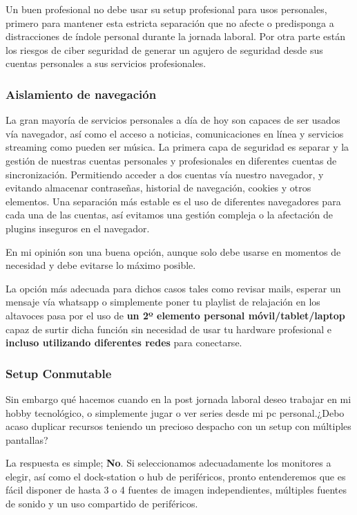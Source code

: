Un buen profesional no debe usar su setup profesional para usos personales, primero para mantener esta estricta separación que no afecte o predisponga a distracciones de índole personal durante la jornada laboral. Por otra parte están los riesgos de ciber seguridad de generar un agujero de seguridad desde sus cuentas personales a sus servicios profesionales.

\subsubsection{Aislamiento de navegación}
La gran mayoría de servicios personales a día de hoy son capaces de ser usados vía navegador, así como el acceso a noticias, comunicaciones en línea y servicios streaming como pueden ser música. La primera capa de seguridad es separar y la gestión de nuestras cuentas personales y profesionales en diferentes cuentas de sincronización. Permitiendo acceder a dos cuentas vía nuestro navegador, y evitando almacenar contraseñas, historial de navegación, cookies y otros elementos. Una separación más estable es el uso de diferentes navegadores para cada una de las cuentas, así evitamos una gestión compleja o la afectación de plugins inseguros en el navegador.

En mi opinión son una buena opción, aunque solo debe usarse en momentos de necesidad y debe evitarse lo máximo posible.

La opción más adecuada para dichos casos tales como revisar mails, esperar un mensaje vía whatsapp o simplemente poner tu playlist de relajación en los altavoces pasa por el uso de \textbf{un 2º elemento personal móvil/tablet/laptop} capaz de surtir dicha función sin necesidad de usar tu hardware profesional e \textbf{incluso utilizando diferentes redes} para conectarse.

\subsubsection{Setup Conmutable}
Sin embargo qué hacemos cuando en la post jornada laboral deseo trabajar en mi hobby tecnológico, o simplemente jugar o ver series desde mi pc personal.¿Debo acaso duplicar recursos teniendo un precioso despacho con un setup con múltiples pantallas?

La respuesta es simple; \textbf{No}. Si seleccionamos adecuadamente los monitores a elegir, así como el dock-station o hub de periféricos, pronto entenderemos que es fácil disponer de hasta 3 o 4 fuentes de imagen independientes, múltiples fuentes de sonido y un uso compartido de periféricos. 

